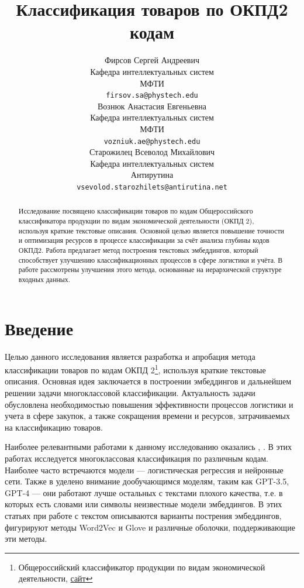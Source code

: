 \documentclass{article}
\title{Классификация товаров по ОКПД2 кодам}
\author{ Фирсов Сергей Андреевич\\
        Кафедра интеллектуальных систем\\
	МФТИ\\
	\texttt{firsov.sa@phystech.edu} \\
	\And
        Вознюк Анастасия Евгеньевна \\
	Кафедра интеллектуальных систем \\
        МФТИ \\
        \texttt{vozniuk.ae@phystech.edu} \\
	\AND
	Старожилец Всеволод Михайлович  \\
	Кафедра интеллектуальных систем\\
	Антирутина\\
	\texttt{vsevolod.starozhilets@antirutina.net} \\
}
\date{}
\begin{document}
\maketitle

\begin{abstract}
    Исследование посвящено классификации товаров по кодам Общероссийского классификатора продукции по видам экономической деятельности (ОКПД 2), используя краткие текстовые описания. Основной целью является повышение точности и оптимизация ресурсов в процессе классификации за счёт анализа глубины кодов ОКПД2. Работа предлагает метод построения текстовых эмбеддингов, который способствует улучшению классификационных процессов в сфере логистики и учёта. В работе рассмотрены улучшения этого метода, основанные на иерархической структуре входных данных.
\end{abstract}



\section{Введение}

Целью данного исследования является разработка и апробация метода классификации товаров по кодам ОКПД 2\footnote{Общероссийский классификатор продукции по видам экономической деятельности, \href{https://classifikators.ru/okpd}{сайт}}, используя краткие текстовые описания. Основная идея заключается в построении эмбеддингов и дальнейшем решении задачи многоклассовой классификации. Актуальность задачи обусловлена необходимостью повышения эффективности процессов логистики и учета в сфере закупок, а также сокращения времени и ресурсов, затрачиваемых на классификацию товаров. %



Наиболее релевантными работами к данному исследованию оказались \cite{Marra2021AutomaticClassification}, \cite{Lewis2004ReutersCodes} \cite{Haav2021HSCodes}. В этих работах исследуется многоклассовая классификация по различным кодам. Наиболее часто встречаются модели ---  логистическая регрессия и нейронные сети. Также в \cite{Marra2021AutomaticClassification} уделено внимание дообучающимся моделям, таким как GPT-3.5, GPT-4 --- они работают лучше остальных с текстами плохого качества, т.е. в которых есть словами или символы неизвестные модели эмбеддингов. В этих статьях при работе с текстом описываются варианты пострения эмбеддингов, фигурируют методы Word2Vec и Glove и различные оболочки, поддерживающие эти методы.  
\end{document}
